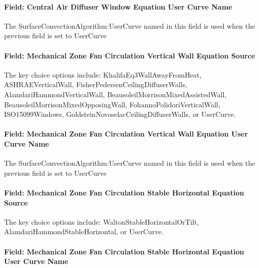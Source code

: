 \paragraph{Field: Central Air Diffuser Window Equation User Curve Name}\label{field-central-air-diffuser-window-equation-user-curve-name}

The SurfaceConvectionAlgorithm:UserCurve named in this field is used when the previous field is set to UserCurve

\paragraph{Field: Mechanical Zone Fan Circulation Vertical Wall Equation Source}\label{field-mechanical-zone-fan-circulation-vertical-wall-equation-source}

The key choice options include: KhalifaEq3WallAwayFromHeat, ASHRAEVerticalWall, FisherPedersenCeilingDiffuserWalls, AlamdariHammondVerticalWall, BeausoleilMorrisonMixedAssistedWall, BeausoleilMorrisonMixedOpposingWall, FohannoPolidoriVerticalWall, ISO15099Windows, GoldsteinNovoselacCeilingDiffuserWalls, or UserCurve.

\paragraph{Field: Mechanical Zone Fan Circulation Vertical Wall Equation User Curve Name}\label{field-mechanical-zone-fan-circulation-vertical-wall-equation-user-curve-name}

The SurfaceConvectionAlgorithm:UserCurve named in this field is used when the previous field is set to UserCurve

\paragraph{Field: Mechanical Zone Fan Circulation Stable Horizontal Equation Source}\label{field-mechanical-zone-fan-circulation-stable-horizontal-equation-source}

The key choice options include: WaltonStableHorizontalOrTilt, AlamdariHammondStableHorizontal, or UserCurve.

\paragraph{Field: Mechanical Zone Fan Circulation Stable Horizontal Equation User Curve Name}\label{field-mechanical-zone-fan-circulation-stable-horizontal-equation-user-curve-name}

